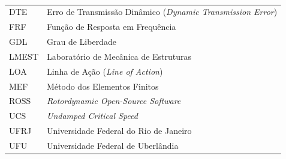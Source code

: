  \\
\begingroup
\begin{longtable}{p{} p{}}
	DTE & Erro de Transmissão Dinâmico (\textit{Dynamic Transmission Error}) \\
	FRF & Função de Resposta em Frequência \\
	GDL & Grau de Liberdade \\
	LMEST & Laboratório de Mecânica de Estruturas \\
	LOA & Linha de Ação (\textit{Line of Action}) \\
	MEF & Método dos Elementos Finitos \\
	ROSS & \textit{Rotordynamic Open-Source Software} \\
	UCS & \textit{Undamped Critical Speed} \\
	UFRJ & Universidade Federal do Rio de Janeiro\\
	UFU & Universidade Federal de Uberlândia \\
\end{longtable}
\endgroup